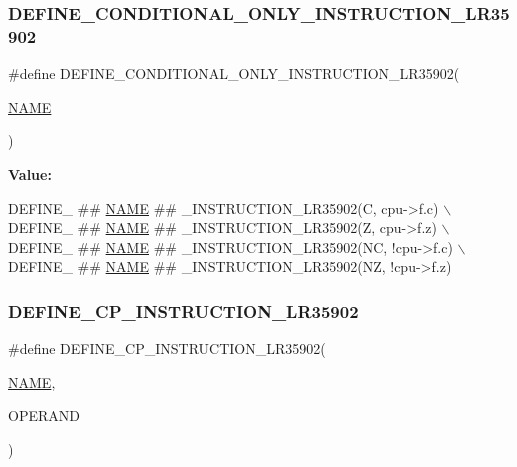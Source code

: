 \subsubsection{\texorpdfstring{D\+E\+F\+I\+N\+E\+\_\+\+C\+O\+N\+D\+I\+T\+I\+O\+N\+A\+L\+\_\+\+O\+N\+L\+Y\+\_\+\+I\+N\+S\+T\+R\+U\+C\+T\+I\+O\+N\+\_\+\+L\+R35902}{DEFINE\_CONDITIONAL\_ONLY\_INSTRUCTION\_LR35902}}
{\footnotesize\ttfamily \#define D\+E\+F\+I\+N\+E\+\_\+\+C\+O\+N\+D\+I\+T\+I\+O\+N\+A\+L\+\_\+\+O\+N\+L\+Y\+\_\+\+I\+N\+S\+T\+R\+U\+C\+T\+I\+O\+N\+\_\+\+L\+R35902(\begin{DoxyParamCaption}\item[{}]{\mbox{\hyperlink{inflate_8h_a164ea0159d5f0b5f12a646f25f99eceaa67bc2ced260a8e43805d2480a785d312}{N\+A\+ME}} }\end{DoxyParamCaption})}

{\bfseries Value\+:}
\begin{DoxyCode}
DEFINE\_ ## \mbox{\hyperlink{inflate_8h_a164ea0159d5f0b5f12a646f25f99eceaa67bc2ced260a8e43805d2480a785d312}{NAME}} ## \_INSTRUCTION\_LR35902(C, cpu->f.c) \(\backslash\)
    DEFINE\_ ## \mbox{\hyperlink{inflate_8h_a164ea0159d5f0b5f12a646f25f99eceaa67bc2ced260a8e43805d2480a785d312}{NAME}} ## \_INSTRUCTION\_LR35902(Z, cpu->f.z) \(\backslash\)
    DEFINE\_ ## \mbox{\hyperlink{inflate_8h_a164ea0159d5f0b5f12a646f25f99eceaa67bc2ced260a8e43805d2480a785d312}{NAME}} ## \_INSTRUCTION\_LR35902(NC, !cpu->f.c) \(\backslash\)
    DEFINE\_ ## \mbox{\hyperlink{inflate_8h_a164ea0159d5f0b5f12a646f25f99eceaa67bc2ced260a8e43805d2480a785d312}{NAME}} ## \_INSTRUCTION\_LR35902(NZ, !cpu->f.z)
\end{DoxyCode}
\mbox{\label{isa-lr35902_8c_ab884e04973eae57e5ce23844d5284816}} 
\subsubsection{\texorpdfstring{D\+E\+F\+I\+N\+E\+\_\+\+C\+P\+\_\+\+I\+N\+S\+T\+R\+U\+C\+T\+I\+O\+N\+\_\+\+L\+R35902}{DEFINE\_CP\_INSTRUCTION\_LR35902}}
{\footnotesize\ttfamily \#define D\+E\+F\+I\+N\+E\+\_\+\+C\+P\+\_\+\+I\+N\+S\+T\+R\+U\+C\+T\+I\+O\+N\+\_\+\+L\+R35902(\begin{DoxyParamCaption}\item[{}]{\mbox{\hyperlink{inflate_8h_a164ea0159d5f0b5f12a646f25f99eceaa67bc2ced260a8e43805d2480a785d312}{N\+A\+ME}},  }\item[{}]{O\+P\+E\+R\+A\+ND }\end{DoxyParamCaption})}

